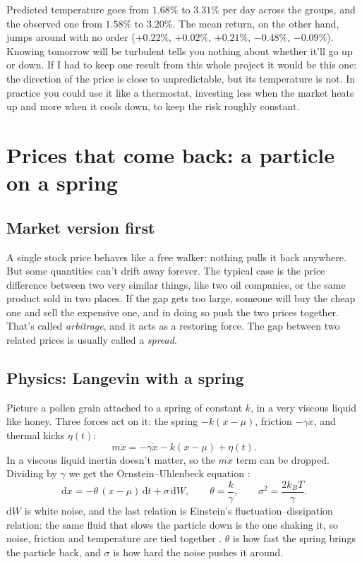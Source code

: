 \documentclass[11pt,a4paper]{article}
\newcommand{\dd}{\mathrm{d}}
\begin{document}
Predicted temperature goes from $1.68\%$ to $3.31\%$ per day across the groups, and the observed one from
$1.58\%$ to $3.20\%$. The mean return, on the other hand, jumps around with no order ($+0.22\%$,
$+0.02\%$, $+0.21\%$, $-0.48\%$, $-0.09\%$). Knowing tomorrow will be turbulent tells you nothing about
whether it'll go up or down. If I had to keep one result from this whole project it would be this one:
the direction of the price is close to unpredictable, but its temperature is not. In practice you could
use it like a thermostat, investing less when the market heats up and more when it cools down, to keep the
risk roughly constant.

\section{Prices that come back: a particle on a spring}
\label{sec:spring}

\subsection{Market version first}

A single stock price behaves like a free walker: nothing pulls it back anywhere. But some quantities can't
drift away forever. The typical case is the price difference between two very similar things, like two
oil companies, or the same product sold in two places. If the gap gets too large, someone will buy the
cheap one and sell the expensive one, and in doing so push the two prices together. That's called
\emph{arbitrage}, and it acts as a restoring force. The gap between two related prices is usually called a
\emph{spread}.

\subsection{Physics: Langevin with a spring}

Picture a pollen grain attached to a spring of constant $k$, in a very viscous liquid like honey. Three
forces act on it: the spring $-k(x-\mu)$, friction $-\gamma\dot x$, and thermal kicks $\eta(t)$:
\begin{equation}
m\ddot x=-\gamma\dot x-k(x-\mu)+\eta(t) .
\end{equation}
In a viscous liquid inertia doesn't matter, so the $m\ddot x$ term can be dropped. Dividing by $\gamma$ we
get the Ornstein--Uhlenbeck equation \cite{uhlenbeck1930}:
\begin{equation}
\dd x=-\theta\,(x-\mu)\,\dd t+\sigma\,\dd W,\qquad \theta=\frac{k}{\gamma},\qquad
\sigma^2=\frac{2k_BT}{\gamma}.
\label{eq:ou}
\end{equation}
$\dd W$ is white noise, and the last relation is Einstein's fluctuation--dissipation relation: the same
fluid that slows the particle down is the one shaking it, so noise, friction and temperature are tied
together \cite{uam_me4,gardiner2009}. $\theta$ is how fast the spring brings the particle back, and $\sigma$
is how hard the noise pushes it around.
\end{document}
